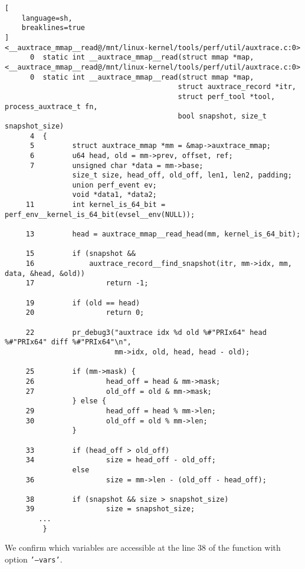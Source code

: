 \documentclass[11pt]{diazessay} %
\def\code#1{\texttt{#1}}
\begin{document}
\begin{lstlisting}[
  	language=sh,
	breaklines=true
]
<__auxtrace_mmap__read@/mnt/linux-kernel/tools/perf/util/auxtrace.c:0>
      0  static int __auxtrace_mmap__read(struct mmap *map,
<__auxtrace_mmap__read@/mnt/linux-kernel/tools/perf/util/auxtrace.c:0>
      0  static int __auxtrace_mmap__read(struct mmap *map,
                                         struct auxtrace_record *itr,
                                         struct perf_tool *tool, process_auxtrace_t fn,
                                         bool snapshot, size_t snapshot_size)
      4  {
      5         struct auxtrace_mmap *mm = &map->auxtrace_mmap;
      6         u64 head, old = mm->prev, offset, ref;
      7         unsigned char *data = mm->base;
                size_t size, head_off, old_off, len1, len2, padding;
                union perf_event ev;
                void *data1, *data2;
     11         int kernel_is_64_bit = perf_env__kernel_is_64_bit(evsel__env(NULL));

     13         head = auxtrace_mmap__read_head(mm, kernel_is_64_bit);

     15         if (snapshot &&
     16             auxtrace_record__find_snapshot(itr, mm->idx, mm, data, &head, &old))
     17                 return -1;

     19         if (old == head)
     20                 return 0;

     22         pr_debug3("auxtrace idx %d old %#"PRIx64" head %#"PRIx64" diff %#"PRIx64"\n",
                          mm->idx, old, head, head - old);

     25         if (mm->mask) {
     26                 head_off = head & mm->mask;
     27                 old_off = old & mm->mask;
                } else {
     29                 head_off = head % mm->len;
     30                 old_off = old % mm->len;
                }

     33         if (head_off > old_off)
     34                 size = head_off - old_off;
                else
     36                 size = mm->len - (old_off - head_off);

     38         if (snapshot && size > snapshot_size)
     39                 size = snapshot_size;
		...
         }
\end{lstlisting}

We confirm which variables are accessible at the line 38 of the function with
option \code{'---vars'}.
\end{document}
